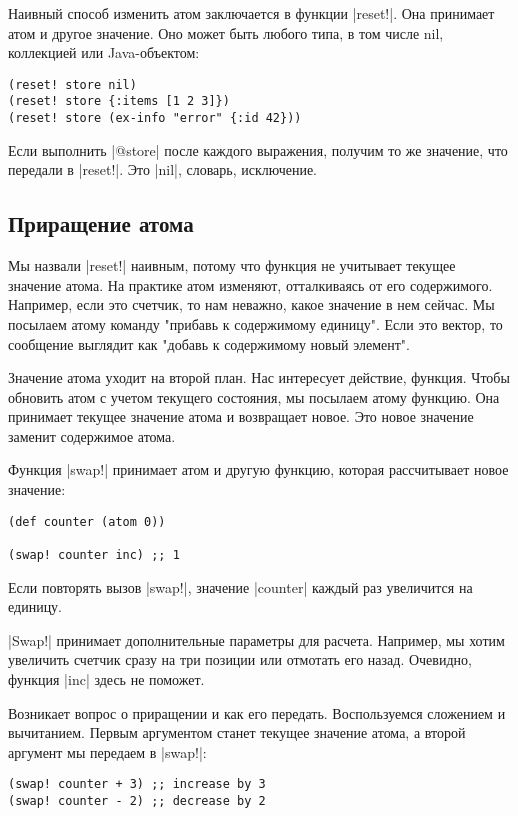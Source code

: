 Наивный способ изменить атом заключается в функции \spverb|reset!|. Она принимает атом
и другое значение. Оно может быть любого типа, в том числе nil, коллекцией или
Java-объектом:

\begin{verbatim}
(reset! store nil)
(reset! store {:items [1 2 3]})
(reset! store (ex-info "error" {:id 42}))
\end{verbatim}

Если выполнить \spverb|@store| после каждого выражения, получим то же значение, что
передали в \spverb|reset!|. Это \spverb|nil|, словарь, исключение.

\subsection{Приращение атома}

Мы назвали \spverb|reset!| наивным, потому что функция не учитывает текущее значение
атома. На практике атом изменяют, отталкиваясь от его содержимого. Например,
если это счетчик, то нам неважно, какое значение в нем сейчас. Мы посылаем атому
команду "прибавь к содержимому единицу". Если это вектор, то сообщение выглядит
как "добавь к содержимому новый элемент".

Значение атома уходит на второй план. Нас интересует действие, функция. Чтобы
обновить атом с учетом текущего состояния, мы посылаем атому функцию. Она
принимает текущее значение атома и возвращает новое. Это новое значение заменит
содержимое атома.

Функция \spverb|swap!| принимает атом и другую функцию, которая рассчитывает новое
значение:

\begin{verbatim}
(def counter (atom 0))

(swap! counter inc) ;; 1
\end{verbatim}

Если повторять вызов \spverb|swap!|, значение \spverb|counter| каждый раз увеличится на
единицу.

\spverb|Swap!| принимает дополнительные параметры для расчета. Например, мы хотим
увеличить счетчик сразу на три позиции или отмотать его назад. Очевидно, функция
\spverb|inc| здесь не поможет.

Возникает вопрос о приращении и как его передать. Воспользуемся сложением и
вычитанием. Первым аргументом станет текущее значение атома, а второй аргумент
мы передаем в \spverb|swap!|:

\begin{verbatim}
(swap! counter + 3) ;; increase by 3
(swap! counter - 2) ;; decrease by 2
\end{verbatim}

